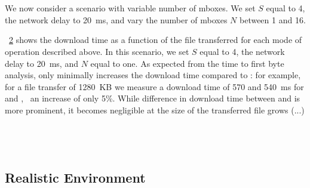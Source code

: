 \documentclass{article}
\begin{document}
\\
\\

\newpage
\begin{figure}[!htbp]
\centering
{}
\label{fig:eval_3}
\end{figure}

We now consider a scenario with variable number of mboxes. We set $S$
equal to 4, the network delay to 20~ms, and vary the number of mboxes
$N$ between 1 and 16. 


\newpage
\begin{figure}[t]
\centering
{}
\label{fig:eval_4}
\end{figure}

\fig~\ref{fig:eval_4} shows the download time as a function of the
file transferred for each mode of operation described above. In this
scenario, we set $S$ equal to 4, the network delay to 20~ms, and $N$
equal to one.  As expected from the time to first byte analysis,
\sppt only minimally increases the download time compared to
\fwd: for example, for a file transfer of 1280~KB we measure a
download time of 570 and 540~ms for \sppt and \fwd, \ie~an
increase of only 5\%. While difference in download time between
\sppt and \ssl is more prominent, it becomes negligible at
the size of the transferred file grows (...) \\

\\

\\

\\


\newpage
\subsection{Realistic Environment}
\begin{figure}[t]
\centering
{}
\label{fig:eval_5}
\end{figure}
\end{document}
